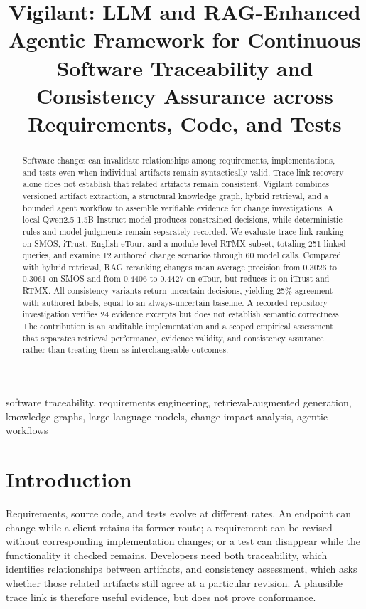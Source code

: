 \documentclass[conference,letterpaper,10pt]{IEEEtran}
\begin{document}
\title{Vigilant: LLM and RAG-Enhanced Agentic Framework for Continuous Software Traceability and Consistency Assurance across Requirements, Code, and Tests}
\author{}
\maketitle
\begin{abstract}
Software changes can invalidate relationships among requirements, implementations, and tests even when individual artifacts remain syntactically valid. Trace-link recovery alone does not establish that related artifacts remain consistent. Vigilant combines versioned artifact extraction, a structural knowledge graph, hybrid retrieval, and a bounded agent workflow to assemble verifiable evidence for change investigations. A local Qwen2.5-1.5B-Instruct model produces constrained decisions, while deterministic rules and model judgments remain separately recorded. We evaluate trace-link ranking on SMOS, iTrust, English eTour, and a module-level RTMX subset, totaling 251 linked queries, and examine 12 authored change scenarios through 60 model calls. Compared with hybrid retrieval, RAG reranking changes mean average precision from 0.3026 to 0.3061 on SMOS and from 0.4406 to 0.4427 on eTour, but reduces it on iTrust and RTMX. All consistency variants return uncertain decisions, yielding 25\% agreement with authored labels, equal to an always-uncertain baseline. A recorded repository investigation verifies 24 evidence excerpts but does not establish semantic correctness. The contribution is an auditable implementation and a scoped empirical assessment that separates retrieval performance, evidence validity, and consistency assurance rather than treating them as interchangeable outcomes.
\end{abstract}
\begin{IEEEkeywords}
software traceability, requirements engineering, retrieval-augmented generation, knowledge graphs, large language models, change impact analysis, agentic workflows
\end{IEEEkeywords}
\section{Introduction}
Requirements, source code, and tests evolve at different rates. An endpoint can change while a client retains its former route; a requirement can be revised without corresponding implementation changes; or a test can disappear while the functionality it checked remains. Developers need both traceability, which identifies relationships between artifacts, and consistency assessment, which asks whether those related artifacts still agree at a particular revision. A plausible trace link is therefore useful evidence, but does not prove conformance.
\end{document}
